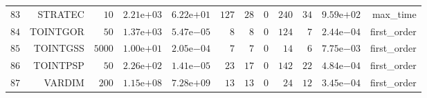 \begin{longtable}{rrrrrrrrrrrr}
  \(    83\) & STRATEC & \(    10\) & \( 2.21\)e\(+03\) & \( 6.22\)e\(+01\) & \(   127\) & \(    28\) & \(     0\) & \(   240\) & \(    34\) & \( 9.59\)e\(+02\) & max\_time \\
  \(    84\) & TOINTGOR & \(    50\) & \( 1.37\)e\(+03\) & \( 5.47\)e\(-05\) & \(     8\) & \(     8\) & \(     0\) & \(   124\) & \(     7\) & \( 2.44\)e\(-04\) & first\_order \\
  \(    85\) & TOINTGSS & \(  5000\) & \( 1.00\)e\(+01\) & \( 2.05\)e\(-04\) & \(     7\) & \(     7\) & \(     0\) & \(    14\) & \(     6\) & \( 7.75\)e\(-03\) & first\_order \\
  \(    86\) & TOINTPSP & \(    50\) & \( 2.26\)e\(+02\) & \( 1.41\)e\(-05\) & \(    23\) & \(    17\) & \(     0\) & \(   142\) & \(    22\) & \( 4.84\)e\(-04\) & first\_order \\
  \(    87\) & VARDIM & \(   200\) & \( 1.15\)e\(+08\) & \( 7.28\)e\(+09\) & \(    13\) & \(    13\) & \(     0\) & \(    24\) & \(    12\) & \( 3.45\)e\(-04\) & first\_order \\\hline
\end{longtable}
